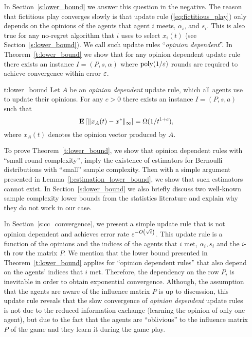 In Section~\ref{s:lower_bound} we answer this question in the negative.
The reason that fictitious play converges slowly is that
update rule (\ref{eq:fictitious_play})
only depends on the opinions of the agents that agent $i$ meets,
$\alpha_i$, and $s_i$. This is also true for any no-regret algorithm
that $i$ uses to select $x_i(t)$ (see Section~\ref{s:lower_bound}).
We call such update rules \enquote{\emph{opinion dependent}}.
In Theorem~\ref{t:lower_bound} we
show that for any opinion dependent update rule there exists an instance
$I = (P,s,\alpha)$ where $\mathrm{poly}(1/\varepsilon)$ rounds are required to
achieve convergence within error $\varepsilon$.
\begin{reptheorem}{t:lower_bound}
  Let $A$ be an \emph{opinion dependent} update rule, which all
  agents use to update their opinions.
  For any $c>0$ there exists an instance $I=(P,s,a)$ such that
  \[
    \Exp{\norm{\infty}{x_A(t) - x^*}} = \Omega(1/t^{1+c}),
  \]
  where $x_A(t)$ denotes the opinion vector produced by $A$.
\end{reptheorem}
%
To prove Theorem~\ref{t:lower_bound}, we show that opinion dependent rules with
\enquote{small round complexity}, imply the existence
of estimators for Bernoulli distributions with
\enquote{small} sample complexity. Then with a simple argument
presented in Lemma~\ref{l:estimation_lower_bound},
we show that such estimators cannot exist.
In Section~\ref{s:lower_bound} we also
briefly discuss two well-known sample complexity lower bounds
from the statistics literature and explain why they do not work in our case.

In Section~\ref{s:cc_convergence}, we present a simple update rule that
is not opinion dependent and  achieves error rate $e^{-O\left(\sqrt{t}\right)}$.
This update rule is a function of the opinions and the indices of the agents
that $i$ met, $\alpha_i,s_i$ and the $i$-th row the matrix $P$.
We mention that the lower bound presented in Theorem~\ref{t:lower_bound}
applies for \enquote{opinion dependent rules} that also depend on the
agents' indices that $i$ met.  Therefore, the dependency on the row $P_i$ is
inevitable in order to obtain exponential convergence.
Although, the assumption that the agents are aware of the influence matrix
$P$ is up to discussion, this update rule reveals that the slow convergence of
\emph{opinion dependent} update rules is not due to the reduced information exchange
(learning the opinion of only one agent), but due to the fact
that the agents are \enquote{oblivious} to the influence matrix $P$ of the
game and they learn it during the game play.

